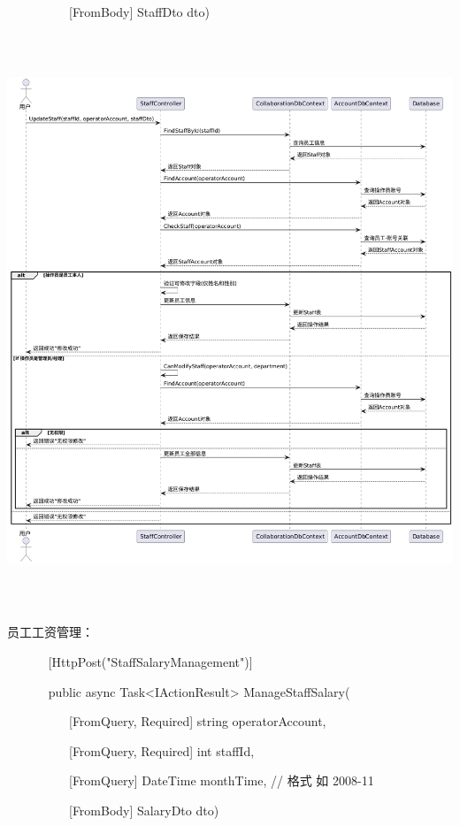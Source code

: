 \documentclass[]{article}
\begin{document}
~ ~ ~ ~ ~ ~ {[}FromBody{]} StaffDto dto)

\includegraphics[width=6.20625in,height=6.7625in]{media/media/image17.png}

员工工资管理：

~ ~ ~ ~ {[}HttpPost("StaffSalaryManagement"){]}

~ ~ ~ ~ public async Task\textless{}IActionResult\textgreater{}
ManageStaffSalary(

~ ~ ~ ~ ~ ~ {[}FromQuery, Required{]} string operatorAccount,

~ ~ ~ ~ ~ ~ {[}FromQuery, Required{]} int staffId,

~ ~ ~ ~ ~ ~ {[}FromQuery{]} DateTime monthTime, // 格式 如 2008-11

~ ~ ~ ~ ~ ~ {[}FromBody{]} SalaryDto dto)
\end{document}
